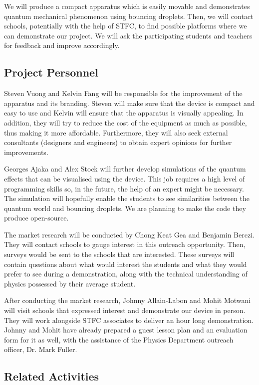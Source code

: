 We will produce a compact apparatus which is easily movable and demonstrates quantum mechanical phenomenon using bouncing droplets. Then, we will contact schools, potentially with the help of STFC, to find possible platforms where we can demonstrate our project. We will ask the participating students and teachers for feedback and improve accordingly. 


\bigskip

\subsection{Project Personnel}

Steven Vuong and Kelvin Fang will be responsible for the improvement of the apparatus and its branding. Steven will make sure that the device is compact and easy to use and Kelvin will ensure that the apparatus is visually appealing. In addition, they will try to reduce the cost of the equipment as much as possible, thus making it more affordable. Furthermore, they will also seek external consultants (designers and engineers) to obtain expert opinions for further improvements.

Georges Ajaka and Alex Stock will further develop simulations of the quantum effects that can be visualised using the device. This job requires a high level of programming skills so, in the future, the help of an expert might be necessary. The simulation will hopefully enable the students to see similarities between the quantum world and bouncing droplets. We are planning to make the code they produce open-source.

The market research will be conducted by Chong Keat Gea and Benjamin Berczi. They will contact schools to gauge interest in this outreach opportunity. Then, surveys would be sent to the schools that are interested. These surveys will contain questions about what would interest the students and what they would prefer to see during a demonstration, along with the technical understanding of physics possessed by their average student. 

After conducting the market research, Johnny Allain-Labon and Mohit Motwani will visit schools that expressed interest and demonstrate our device in person. They will work alongside STFC associates to deliver an hour long demonstration. Johnny and Mohit have already prepared a guest lesson plan and an evaluation form for it as well, with the assistance of the Physics Department outreach officer, Dr. Mark Fuller. 

\subsection{Related Activities}

